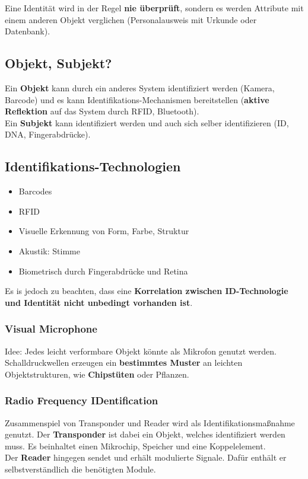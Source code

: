 \documentclass[a4paper]{article}
\begin{document}
Eine Identität wird in der Regel \textbf{nie überprüft}, sondern es werden Attribute mit einem anderen Objekt verglichen (Personalausweis mit Urkunde oder Datenbank).
\subsection{Objekt, Subjekt?}
Ein \textbf{Objekt} kann durch ein anderes System identifiziert werden (Kamera, Barcode) und es kann Identifikations-Mechanismen bereitstellen (\textbf{aktive Reflektion} auf das System durch RFID, Bluetooth).\\
Ein \textbf{Subjekt} kann identifiziert werden und auch sich selber identifizieren (ID, DNA, Fingerabdrücke).

\subsection{Identifikations-Technologien}
\begin{itemize}
	\item Barcodes
	\item RFID
	\item Visuelle Erkennung von Form, Farbe, Struktur
	\item Akustik: Stimme
	\item Biometrisch durch Fingerabdrücke und Retina
\end{itemize}
Es is jedoch zu beachten, dass eine \textbf{Korrelation zwischen ID-Technologie und Identität nicht unbedingt vorhanden ist}.
\subsubsection{Visual Microphone}
Idee: Jedes leicht verformbare Objekt könnte als Mikrofon genutzt werden. Schalldruckwellen erzeugen ein \textbf{bestimmtes Muster} an leichten Objektstrukturen, wie \textbf{Chipstüten} oder Pflanzen.
\subsubsection{Radio Frequency IDentification}
Zusammenspiel von Transponder und Reader wird als Identifikationsmaßnahme genutzt.
Der \textbf{Transponder} ist dabei ein Objekt, welches identifiziert werden muss. Es beinhaltet einen Mikrochip, Speicher und eine Koppelelement.\\
Der \textbf{Reader} hingegen sendet und erhält modulierte Signale. Dafür enthält er selbstverständlich die benötigten Module.\\
\end{document}

